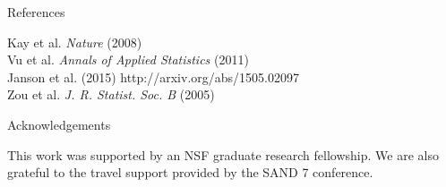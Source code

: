 \documentclass[final]{beamer}
\newlength{\onecolwid}
\begin{document}
\begin{frame}[t]
\begin{columns}[t]
\begin{column}{\onecolwid}

\begin{block}{References}

\small{
\noindent [1] Kay et al. \emph{Nature} (2008)\\
\noindent [2] Vu et al. \emph{Annals of Applied Statistics} (2011)\\
\noindent [3] Janson et al. (2015) http://arxiv.org/abs/1505.02097\\
\noindent [4] Zou et al. \emph{J. R. Statist. Soc. B} (2005)
}

\end{block}


\begin{block}{Acknowledgements}


\small{ This work was supported by an NSF graduate research fellowship.
  We are also grateful to the travel support provided by the SAND 7 conference.  }

\end{block}





\end{column} %

\end{columns} %

\end{frame} %
\end{document}
